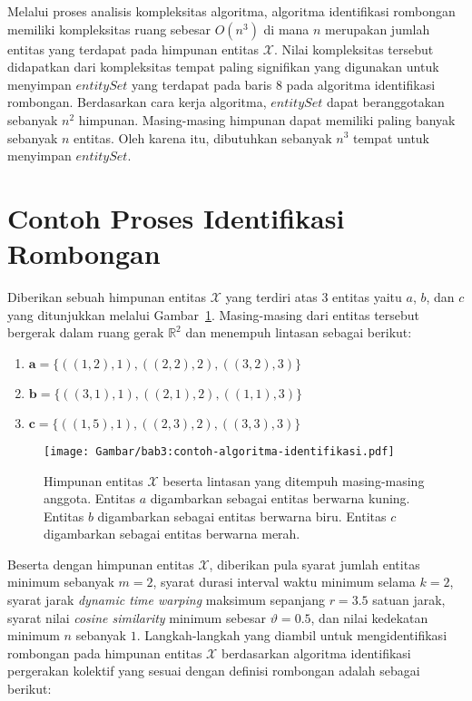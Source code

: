 Melalui proses analisis kompleksitas algoritma, algoritma identifikasi rombongan memiliki kompleksitas ruang sebesar $O(n^3)$ di mana $n$ merupakan jumlah entitas yang terdapat pada himpunan entitas $\mathcal{X}$. Nilai kompleksitas tersebut didapatkan dari kompleksitas tempat paling signifikan yang digunakan untuk menyimpan $entitySet$ yang terdapat pada baris $8$ pada algoritma identifikasi rombongan. Berdasarkan cara kerja algoritma, $entitySet$ dapat beranggotakan sebanyak $n^2$ himpunan. Masing-masing himpunan dapat memiliki paling banyak sebanyak $n$ entitas. Oleh karena itu, dibutuhkan sebanyak $n^3$ tempat untuk menyimpan $entitySet$.

\section{Contoh Proses Identifikasi Rombongan}
\label{sec:algorithm-example}

Diberikan sebuah himpunan entitas $\mathcal{X}$ yang terdiri atas 3 entitas yaitu $a$, $b$, dan $c$ yang ditunjukkan melalui Gambar~\ref{bab3:contoh-algoritma-identifikasi}. Masing-masing dari entitas tersebut bergerak dalam ruang gerak $\mathbb{R}^2$ dan menempuh lintasan sebagai berikut:

\begin{enumerate}
    \item $\textbf{a} = \{ ((1, 2), 1), ((2, 2), 2),  ((3, 2), 3) \}$
    \item $\textbf{b} = \{ ((3, 1), 1), ((2, 1), 2), ((1, 1), 3) \}$
    \item $\textbf{c} = \{ ((1, 5), 1), ((2, 3), 2), ((3, 3), 3) \}$
\end{enumerate}

\begin{figure}[t]
    \centering
    \captionsetup{width=0.7\textwidth}
    \texttt{[image: Gambar/bab3:contoh-algoritma-identifikasi.pdf]}
    \caption[Contoh proses algoritma identifikasi rombongan]{Himpunan entitas $\mathcal{X}$ beserta lintasan yang ditempuh masing-masing anggota. Entitas $a$ digambarkan sebagai entitas berwarna kuning. Entitas $b$ digambarkan sebagai entitas berwarna biru. Entitas $c$ digambarkan sebagai entitas berwarna merah.}
    \label{bab3:contoh-algoritma-identifikasi}
\end{figure}

Beserta dengan himpunan entitas $\mathcal{X}$, diberikan pula syarat jumlah entitas minimum sebanyak $m = 2$, syarat durasi interval waktu minimum selama $k = 2$, syarat jarak \textit{dynamic time warping} maksimum sepanjang $r = 3.5$ satuan jarak, syarat nilai \textit{cosine similarity} minimum sebesar $\vartheta = 0.5$, dan nilai kedekatan minimum $n$ sebanyak $1$. Langkah-langkah yang diambil untuk mengidentifikasi rombongan pada himpunan entitas $\mathcal{X}$ berdasarkan algoritma identifikasi pergerakan kolektif yang sesuai dengan definisi rombongan adalah sebagai berikut:

